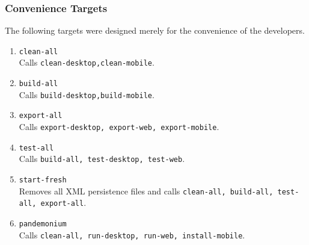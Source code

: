 \documentclass[12pt]{report}
\begin{document}
\subsubsection{Convenience Targets}
\label{s:build-convenience}
The following targets were designed merely for the convenience of the developers. 
\begin{enumerate}
	\item \texttt{clean-all}\\
		Calls \texttt{clean-desktop,clean-mobile}.
	\item \texttt{build-all}\\
		Calls \texttt{build-desktop,build-mobile}.
	\item \texttt{export-all}\\
		Calls \texttt{export-desktop, export-web, export-mobile}.
	\item \texttt{test-all}\\
		Calls \texttt{build-all, test-desktop, test-web}.
	\item \texttt{start-fresh}\\
		Removes all XML persistence files and calls \texttt{clean-all, build-all, test-all, export-all}.
	\item \texttt{pandemonium}\\
		Calls \texttt{clean-all, run-desktop, run-web, install-mobile}.
\end{enumerate}
\end{document}
